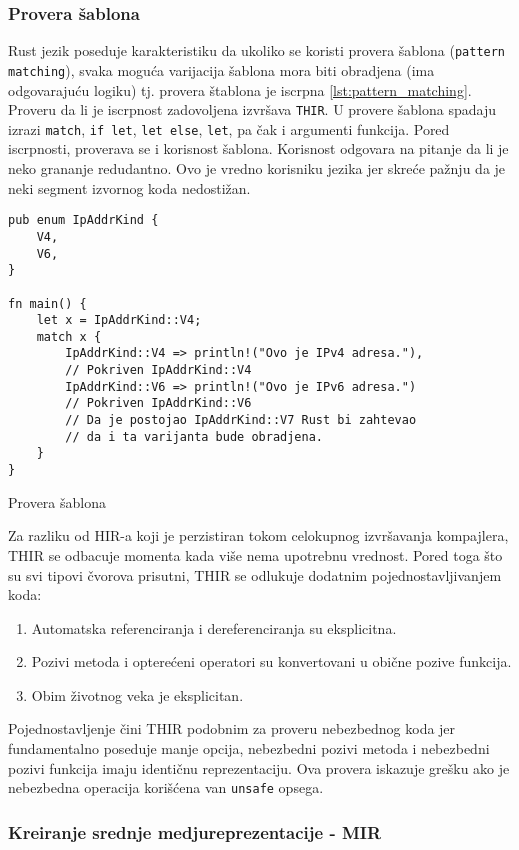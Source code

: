 \subsubsection{Provera šablona}
Rust jezik poseduje karakteristiku da ukoliko se koristi provera šablona (\verb|pattern matching|), svaka moguća 
varijacija šablona mora biti obradjena (ima odgovarajuću logiku) tj. provera štablona je iscrpna \ref{lst:pattern_matching}.
Proveru da li je iscrpnost zadovoljena izvršava \verb|THIR|. U provere šablona spadaju izrazi \verb|match|, \verb|if let|,
\verb|let else|, \verb|let|, pa čak i argumenti funkcija. Pored iscrpnosti, proverava se i korisnost šablona. Korisnost odgovara na pitanje 
da li je neko grananje redudantno. Ovo je vredno korisniku jezika jer skreće pažnju da je neki segment izvornog koda nedostižan. 



\begin{listing}[H]
\begin{verbatim}
pub enum IpAddrKind {
    V4,
    V6,
}

fn main() {
    let x = IpAddrKind::V4;
    match x {
        IpAddrKind::V4 => println!("Ovo je IPv4 adresa."), 
        // Pokriven IpAddrKind::V4
        IpAddrKind::V6 => println!("Ovo je IPv6 adresa.") 
        // Pokriven IpAddrKind::V6
        // Da je postojao IpAddrKind::V7 Rust bi zahtevao 
        // da i ta varijanta bude obradjena.
    }
}
\end{verbatim}
\caption{Provera šablona}
\label{lst:pattern_matching}
\end{listing}

Za razliku od HIR-a koji je perzistiran tokom celokupnog izvršavanja kompajlera, THIR se odbacuje momenta
kada više nema upotrebnu vrednost. Pored toga što su svi tipovi čvorova prisutni, THIR se odlukuje dodatnim 
pojednostavljivanjem koda:
\begin{enumerate}
    \item Automatska referenciranja i dereferenciranja su eksplicitna.
    \item Pozivi metoda i opterećeni operatori su konvertovani u obične pozive funkcija. 
    \item Obim životnog veka je eksplicitan.
\end{enumerate}

Pojednostavljenje čini THIR podobnim za proveru nebezbednog koda jer fundamentalno poseduje manje opcija, 
nebezbedni pozivi metoda i nebezbedni pozivi funkcija imaju identičnu reprezentaciju. Ova provera 
iskazuje grešku ako je nebezbedna operacija korišćena van \verb|unsafe| opsega.

\subsubsection{Kreiranje srednje medjureprezentacije - MIR}